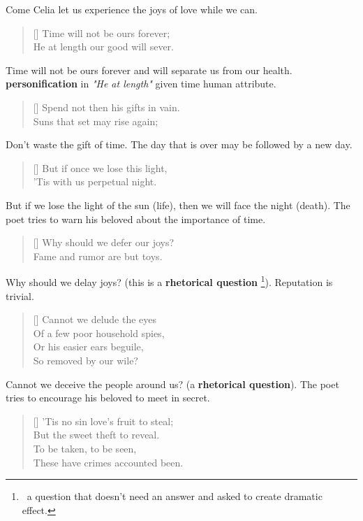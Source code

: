 Come Celia let us experience the joys of love while we can.

\begin{verse}[\versewidth]
{\fontverse
Time will not be ours forever;\\
He at length our good will sever.
}
\end{verse}

Time will not be ours forever and will separate us from 
our health.  \textbf{personification} in \textit{"He at length"}
given time human attribute.

\begin{verse}[\versewidth]
{\fontverse
Spend not then his gifts in vain.\\
Suns that set may rise again;
}
\end{verse}

Don't waste the gift of time. The day that is over 
may be followed by a new day.

\begin{verse}[\versewidth]
{\fontverse
But if once we lose this light,\\
'Tis with us perpetual night.
}
\end{verse}

But if we lose the light of the sun (life), then 
we will face the night (death). The poet tries to warn 
his beloved about the importance of time.

\begin{verse}[\versewidth]
{\fontverse
Why should we defer our joys?\\
Fame and rumor are but toys.
}
\end{verse}

Why should we delay joys? (this is a \textbf{rhetorical question}
\footnote{\, a question that doesn't need an answer and asked to create dramatic effect.}).
Reputation is trivial. 

\begin{verse}[\versewidth]
{\fontverse
Cannot we delude the eyes\\
Of a few poor household spies,\\
Or his easier ears beguile,\\
So removed by our wile?
}
\end{verse}

Cannot we deceive the people around us? (a \textbf{rhetorical question}).
The poet tries to encourage his beloved to meet in secret.

\begin{verse}[\versewidth]
{\fontverse
'Tis no sin love's fruit to steal;\\
But the sweet theft to reveal.\\
To be taken, to be seen,\\
These have crimes accounted been.
}
\end{verse}


